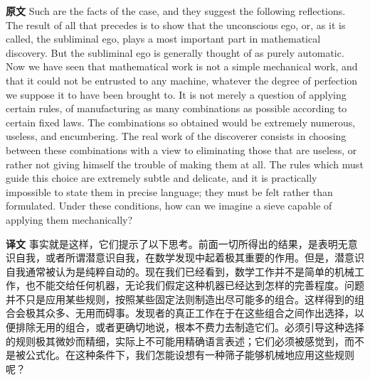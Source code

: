 \documentclass[UTF8]{ctexart}
\newenvironment{english}{\par\small\noindent\textbf{原文}\quad\ignorespaces}{\par}
\newenvironment{zhtranslation}{\par\noindent\textbf{译文}\quad\ignorespaces}{\par\vspace{0.35em}}
\begin{document}
\begin{english}
Such are the facts of the case, and they suggest the following reflections. The result of all that precedes is to show that the unconscious ego, or, as it is called, the subliminal ego, plays a most important part in mathematical discovery. But the subliminal ego is generally thought of as purely automatic. Now we have seen that mathematical work is not a simple mechanical work, and that it could not be entrusted to any machine, whatever the degree of perfection we suppose it to have been brought to. It is not merely a question of applying certain rules, of manufacturing as many combinations as possible according to certain fixed laws. The combinations so obtained would be extremely numerous, useless, and encumbering. The real work of the discoverer consists in choosing between these combinations with a view to eliminating those that are useless, or rather not giving himself the trouble of making them at all. The rules which must guide this choice are extremely subtle and delicate, and it is practically impossible to state them in precise language; they must be felt rather than formulated. Under these conditions, how can we imagine a sieve capable of applying them mechanically?
\end{english}
\begin{zhtranslation}
事实就是这样，它们提示了以下思考。前面一切所得出的结果，是表明无意识自我，或者所谓潜意识自我，在数学发现中起着极其重要的作用。但是，潜意识自我通常被认为是纯粹自动的。现在我们已经看到，数学工作并不是简单的机械工作，也不能交给任何机器，无论我们假定这种机器已经达到怎样的完善程度。问题并不只是应用某些规则，按照某些固定法则制造出尽可能多的组合。这样得到的组合会极其众多、无用而碍事。发现者的真正工作在于在这些组合之间作出选择，以便排除无用的组合，或者更确切地说，根本不费力去制造它们。必须引导这种选择的规则极其微妙而精细，实际上不可能用精确语言表述；它们必须被感觉到，而不是被公式化。在这种条件下，我们怎能设想有一种筛子能够机械地应用这些规则呢？
\end{zhtranslation}
\end{document}
